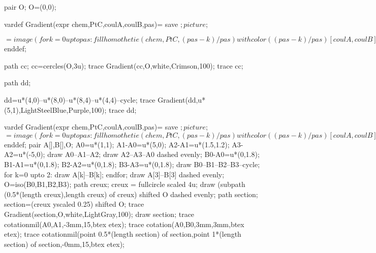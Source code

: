 \begin{exercice*}
    \begin{Geometrie}[Cadre="aucun"]
        pair O;
        O=(0,0);
      
        vardef Gradient(expr chem,PtC,coulA,coulB,pas)=
        save $;
        picture $;
      
        $=image(
        for k=0 upto pas:
        fill homothetie(chem,PtC,(pas-k)/pas) withcolor ((pas-k)/pas)[coulA,coulB];
        endfor;
        );
        $
        enddef;
      
        path cc;
        cc=cercles(O,3u);
        trace Gradient(cc,O,white,Crimson,100);
        trace cc;
      
        path dd;
      
        dd=u*(4,0)--u*(8,0)--u*(8,4)--u*(4,4)--cycle;
        trace Gradient(dd,u*(5,1),LightSteelBlue,Purple,100);
        trace dd;
      \end{Geometrie}

      \begin{Geometrie}[Cadre="aucun"]
        vardef Gradient(expr chem,PtC,coulA,coulB,pas)=
            save $;
            picture $;      
            $=image(
                for k=0 upto pas:
                    fill homothetie(chem,PtC,(pas-k)/pas) withcolor ((pas-k)/pas)[coulA,coulB];
                endfor;
            );
            $
        enddef;
        pair A[],B[],O;
        A0=u*(1,1);
        A1-A0=u*(5,0);
        A2-A1=u*(1.5,1.2);
        A3-A2=u*(-5,0);
        draw A0--A1--A2;
        draw A2--A3--A0 dashed evenly;
        B0-A0=u*(0,1.8);
        B1-A1=u*(0,1.8);
        B2-A2=u*(0,1.8);
        B3-A3=u*(0,1.8);
        draw B0--B1--B2--B3--cycle;
        for k=0 upto 2:
            draw A[k]--B[k];
        endfor;
        draw A[3]--B[3] dashed evenly;
        O=iso(B0,B1,B2,B3);
        path creux;
        creux = fullcircle scaled 4u; 
        draw (subpath (0.5*(length creux),length creux) of creux) shifted O dashed evenly;
        path section;
        section=(creux yscaled 0.25) shifted O;
        trace Gradient(section,O,white,LightGray,100);                
        draw section;
        trace cotationmil(A0,A1,-3mm,15,btex  etex);
        trace cotation(A0,B0,3mm,3mm,btex  etex);        
        trace cotationmil(point 0.5*(length section) of section,point 1*(length section) of section,-0mm,15,btex  etex);
      \end{Geometrie}


\end{exercice*}
